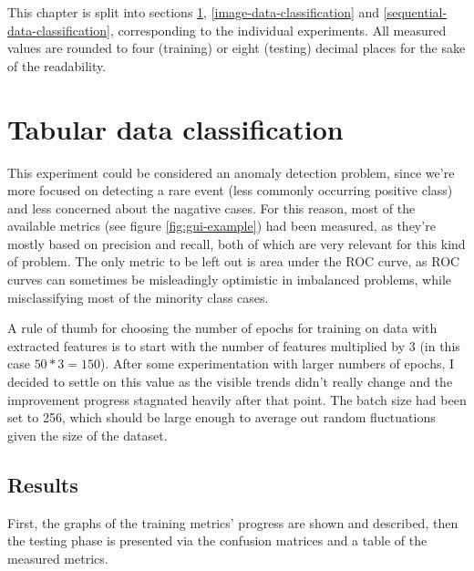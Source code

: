 This chapter is split into sections \ref{Tabular-data-classification}, \ref{image-data-classification} and
\ref{sequential-data-classification}, corresponding to the individual experiments.
All measured values are rounded to four (training) or eight (testing) decimal places
for the sake of the readability.




\section{Tabular data classification}
\label{Tabular-data-classification}
This experiment could be considered an anomaly detection problem, since we're more focused on detecting a rare event
(less commonly occurring positive class) and less concerned about the nagative cases.
For this reason, most of the available metrics (see figure \ref{fig:gui-example}) had been measured, as they're mostly
based on precision and recall,
both of which are very relevant for this kind of problem.
The only metric to be left out is area under the ROC curve,
as ROC curves can sometimes be misleadingly optimistic in imbalanced problems, while misclassifying most of the
minority class cases.

A rule of thumb for choosing the number of epochs for training on data with extracted features is to
start with the number of features multiplied by 3 (in this case $50*3=150$). After some experimentation with larger numbers of epochs, I decided to settle on this value as the visible trends didn't really change and the
improvement progress stagnated heavily after that point.
The batch size had been set to 256, which should be large enough to average out random fluctuations given
the size of the dataset.
\pagebreak


\subsection{Results}
First, the graphs of the training metrics' progress are shown and described, then the testing phase is presented
via the confusion matrices and a table of the measured metrics.


